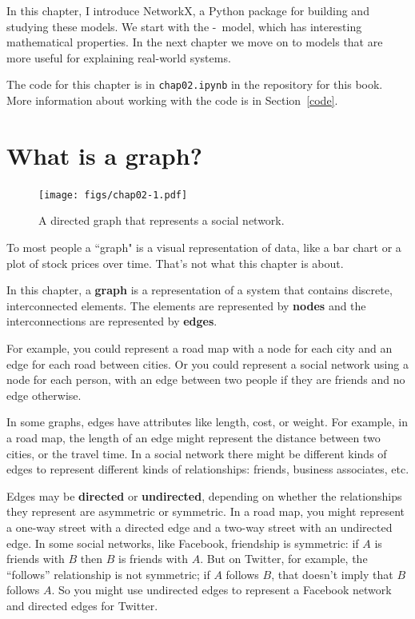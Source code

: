 \documentclass[12pt]{book}
\theoremstyle{exercise}
\begin{document}
In this chapter, I introduce NetworkX, a Python package for building
and studying these models.  We start with the \Erdos-\Renyi~model,
which has interesting mathematical properties.  In the next
chapter we move on to models that are more useful for explaining
real-world systems.

The code for this chapter is in {\tt chap02.ipynb} in the repository
for this book.  More information about working with the code is
in Section~\ref{code}.


\section{What is a graph?}

\begin{figure}
\centerline{\texttt{[image: figs/chap02-1.pdf]}}
\caption{A directed graph that represents a social network.}
\label{chap02-1}
\end{figure}

To most people a ``graph" is a visual representation of data, like
a bar chart or a plot of stock prices over time.  That's not what this
chapter is about.  

In this chapter, a {\bf graph} is a representation of
a system that contains discrete, interconnected elements.  The
elements are represented by {\bf nodes}
and the interconnections are represented by {\bf edges}.

For example, you could represent a road map with a node for each
city and an edge for each road between cities.  Or you could
represent a social network using a node for each person, with an
edge between two people if they are friends and no edge otherwise.

In some graphs, edges have attributes like length, cost, or weight.
For example, in a road map, the length of an edge might represent the
distance between two cities, or the travel time.  In a
social network there might be different kinds of edges to represent
different kinds of relationships: friends, business associates, etc.
 

Edges may be {\bf directed} or {\bf undirected}, depending on whether
the relationships they represent are asymmetric or symmetric.  In a
road map, you might represent a one-way street with a directed edge
and a two-way street with an undirected edge.  In some social
networks, like Facebook, friendship is symmetric: if $A$ is friends
with $B$ then $B$ is friends with $A$.  But on Twitter, for example,
the ``follows'' relationship is not symmetric; if $A$ follows $B$,
that doesn't imply that $B$ follows $A$.  So you might use undirected
edges to represent a Facebook network and directed edges for Twitter.
 
\end{document}
